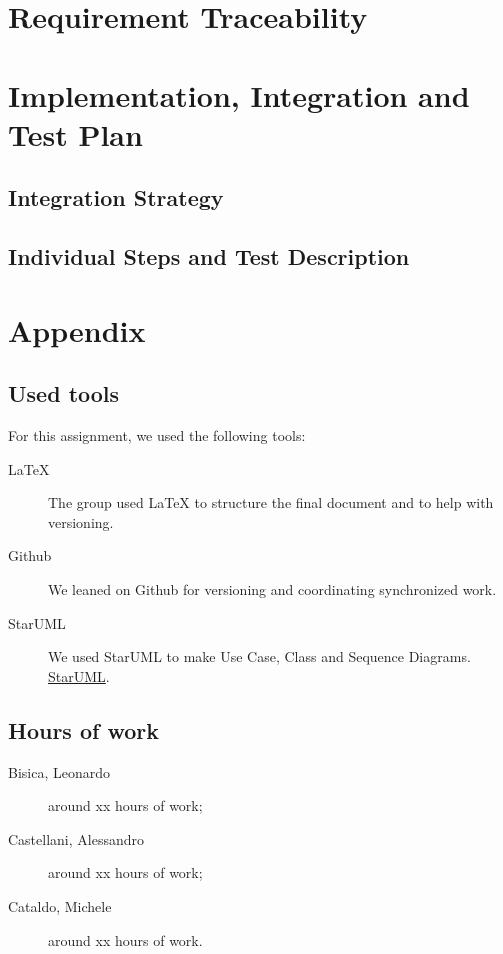 \documentclass[12pt, a4paper]{article}
\begin{document}
		
	\section{Requirement Traceability}
		

	\newpage
	\section{Implementation, Integration and Test Plan}
		
		\subsection{Integration Strategy}
			
			
		\subsection{Individual Steps and Test Description}
			

	\newpage	
	\section{Appendix}
		\listoffigures
		\listofalgorithms
		
		\subsection{Used tools}
		For this assignment, we used the following tools:
		
		\begin{description}
			\item [LaTeX] The group used LaTeX to structure the final document and to help with versioning.
			\item [Github] We leaned on Github for versioning and coordinating synchronized work.
			\item[StarUML] We used StarUML  to make Use Case, Class and Sequence Diagrams. \href{http://staruml.io/}{StarUML}.
			
		\end{description}
		
		\subsection{Hours of work}
			\begin{description}
				\item[Bisica, Leonardo] around xx hours of work;
				\item[Castellani, Alessandro] around xx hours of work;
				\item[Cataldo, Michele] around xx hours of work.
			\end{description}
			
\end{document}
